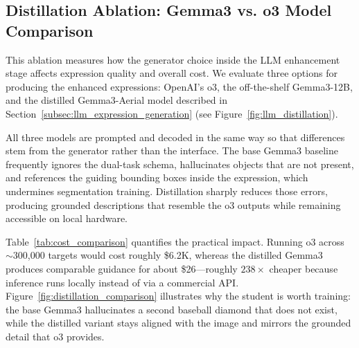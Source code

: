 \documentclass[journal]{IEEEtran}
\begin{document}
\subsection{Distillation Ablation: Gemma3 vs. o3 Model Comparison}
\label{subsec:distillation_ablation}

This ablation measures how the generator choice inside the LLM enhancement stage affects expression quality and overall cost. We evaluate three options for producing the enhanced expressions: OpenAI’s o3, the off-the-shelf Gemma3-12B, and the distilled Gemma3-Aerial model described in Section~\ref{subsec:llm_expression_generation} (see Figure~\ref{fig:llm_distillation}).

All three models are prompted and decoded in the same way so that differences stem from the generator rather than the interface. The base Gemma3 baseline frequently ignores the dual-task schema, hallucinates objects that are not present, and references the guiding bounding boxes inside the expression, which undermines segmentation training. Distillation sharply reduces those errors, producing grounded descriptions that resemble the o3 outputs while remaining accessible on local hardware.

Table~\ref{tab:cost_comparison} quantifies the practical impact. Running o3 across $\sim$300,000 targets would cost roughly \$6.2K, whereas the distilled Gemma3 produces comparable guidance for about \$26—roughly $238\times$ cheaper because inference runs locally instead of via a commercial API. Figure~\ref{fig:distillation_comparison} illustrates why the student is worth training: the base Gemma3 hallucinates a second baseball diamond that does not exist, while the distilled variant stays aligned with the image and mirrors the grounded detail that o3 provides.

\begin{table}[t]
\centering
\caption{Cost Analysis: Gemma3 vs. o3 Model for Large-Scale Annotation (cost calculations based on API pricing with average request token counts)}
\label{tab:cost_comparison}
\end{table}
\end{document}
